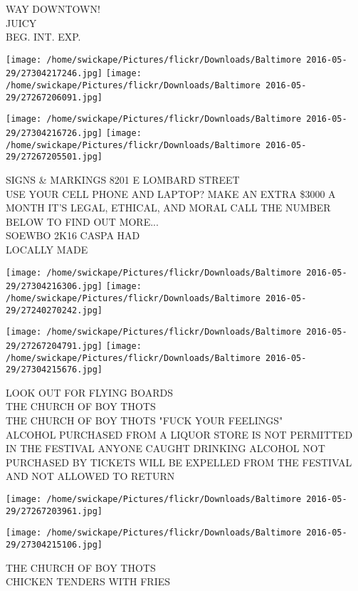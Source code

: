 \documentclass[10pt,letterpaper]{article}
\begin{document}
WAY DOWNTOWN!\\
JUICY\\
BEG. INT. EXP.\\
\pagebreak

\texttt{[image: /home/swickape/Pictures/flickr/Downloads/Baltimore 2016-05-29/27304217246.jpg]}
\texttt{[image: /home/swickape/Pictures/flickr/Downloads/Baltimore 2016-05-29/27267206091.jpg]}

\texttt{[image: /home/swickape/Pictures/flickr/Downloads/Baltimore 2016-05-29/27304216726.jpg]}
\texttt{[image: /home/swickape/Pictures/flickr/Downloads/Baltimore 2016-05-29/27267205501.jpg]}

SIGNS \& MARKINGS 8201 E LOMBARD STREET\\
USE YOUR CELL PHONE AND LAPTOP?  MAKE AN EXTRA \$3000 A MONTH IT'S LEGAL, ETHICAL, AND MORAL CALL THE NUMBER BELOW TO FIND OUT MORE...\\
SOEWBO 2K16 CASPA HAD\\
LOCALLY MADE\\
\pagebreak

\texttt{[image: /home/swickape/Pictures/flickr/Downloads/Baltimore 2016-05-29/27304216306.jpg]}
\texttt{[image: /home/swickape/Pictures/flickr/Downloads/Baltimore 2016-05-29/27240270242.jpg]}

\texttt{[image: /home/swickape/Pictures/flickr/Downloads/Baltimore 2016-05-29/27267204791.jpg]}
\texttt{[image: /home/swickape/Pictures/flickr/Downloads/Baltimore 2016-05-29/27304215676.jpg]}

LOOK OUT FOR FLYING BOARDS\\
THE CHURCH OF BOY THOTS\\
THE CHURCH OF BOY THOTS "FUCK YOUR FEELINGS"\\
ALCOHOL PURCHASED FROM A LIQUOR STORE IS NOT PERMITTED IN THE FESTIVAL ANYONE CAUGHT DRINKING ALCOHOL NOT PURCHASED BY TICKETS WILL BE EXPELLED FROM THE FESTIVAL AND NOT ALLOWED TO RETURN\\
\pagebreak

\texttt{[image: /home/swickape/Pictures/flickr/Downloads/Baltimore 2016-05-29/27267203961.jpg]}

\vspace{0.25in}
\texttt{[image: /home/swickape/Pictures/flickr/Downloads/Baltimore 2016-05-29/27304215106.jpg]}

THE CHURCH OF BOY THOTS\\
CHICKEN TENDERS WITH FRIES\\
\pagebreak
\end{document}
